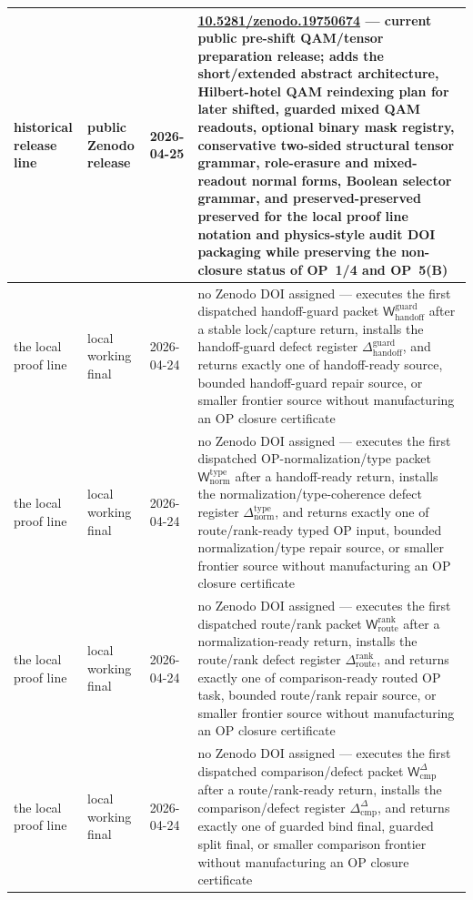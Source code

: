 \documentclass[12pt,a4paper]{article}
\DeclareRobustCommand{\QSCver}[1]{archival stage}
\renewcommand{\QSCver}[1]{historical release line}
\begin{document}
{\begin{longtable}{|P{0.14\textwidth}|P{0.17\textwidth}|P{0.15\textwidth}|P{0.42\textwidth}|}
\hline
\QSCver{legacy.35.0} & public Zenodo release & 2026-04-25 & \href{https://doi.org/10.5281/zenodo.19750674}{10.5281/zenodo.19750674} --- current public pre-shift QAM/tensor preparation release; adds the short/extended abstract architecture, Hilbert-hotel QAM reindexing plan for later shifted, guarded mixed QAM readouts, optional binary mask registry, conservative two-sided structural tensor grammar, role-erasure and mixed-readout normal forms, Boolean selector grammar, and preserved-preserved preserved for the local proof line notation and physics-style audit DOI packaging while preserving the non-closure status of OP~1/4 and OP~5(B) \\
\hline
the local proof line & local working final & 2026-04-24 & no Zenodo DOI assigned --- executes the first dispatched handoff-guard packet \(\mathsf W_{\mathrm{handoff}}^{\mathrm{guard}}\) after a stable lock/capture return, installs the handoff-guard defect register \(\Delta_{\mathrm{handoff}}^{\mathrm{guard}}\), and returns exactly one of handoff-ready source, bounded handoff-guard repair source, or smaller frontier source without manufacturing an OP closure certificate \\
the local proof line & local working final & 2026-04-24 & no Zenodo DOI assigned --- executes the first dispatched OP-normalization/type packet \(\mathsf W_{\mathrm{norm}}^{\mathrm{type}}\) after a handoff-ready return, installs the normalization/type-coherence defect register \(\Delta_{\mathrm{norm}}^{\mathrm{type}}\), and returns exactly one of route/rank-ready typed OP input, bounded normalization/type repair source, or smaller frontier source without manufacturing an OP closure certificate \\
the local proof line & local working final & 2026-04-24 & no Zenodo DOI assigned --- executes the first dispatched route/rank packet \(\mathsf W_{\mathrm{route}}^{\mathrm{rank}}\) after a normalization-ready return, installs the route/rank defect register \(\Delta_{\mathrm{route}}^{\mathrm{rank}}\), and returns exactly one of comparison-ready routed OP task, bounded route/rank repair source, or smaller frontier source without manufacturing an OP closure certificate \\
the local proof line & local working final & 2026-04-24 & no Zenodo DOI assigned --- executes the first dispatched comparison/defect packet \(\mathsf W_{\mathrm{cmp}}^{\Delta}\) after a route/rank-ready return, installs the comparison/defect register \(\Delta_{\mathrm{cmp}}^{\Delta}\), and returns exactly one of guarded bind final, guarded split final, or smaller comparison frontier without manufacturing an OP closure certificate \\

\end{longtable}}
\end{document}
